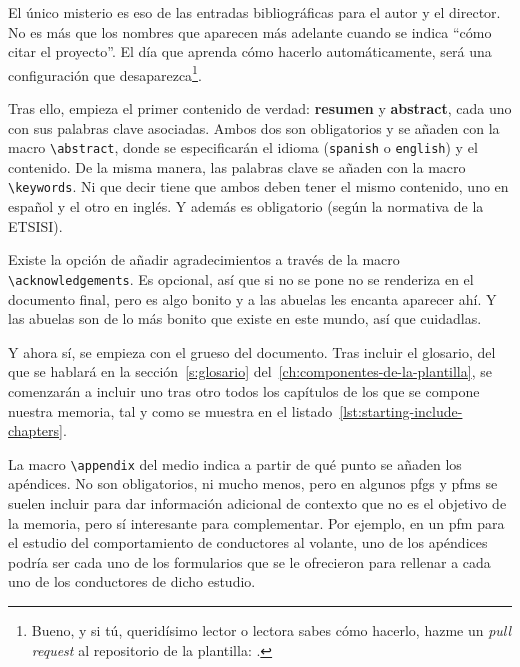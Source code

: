 El único misterio es eso de las entradas bibliográficas para el autor y el director. No es más que los nombres que aparecen más adelante cuando se indica \enquote{cómo citar el proyecto}. El día que aprenda cómo hacerlo automáticamente, será una configuración que desaparezca\footnote{Bueno, y si tú, queridísimo lector o lectora sabes cómo hacerlo, hazme un \textit{pull request} al repositorio de la plantilla: \href{\templaterepository}{\templaterepository}.}.

Tras ello, empieza el primer contenido de verdad: \textbf{resumen} y \textbf{abstract}, cada uno con sus palabras clave asociadas. Ambos dos son obligatorios y se añaden con la macro \lstinline{\abstract}, donde se especificarán el idioma (\texttt{spanish} o \texttt{english}) y el contenido. De la misma manera, las palabras clave se añaden con la macro \lstinline{\keywords}. Ni que decir tiene que ambos deben tener el mismo contenido, uno en español y el otro en inglés. Y además es obligatorio (según la normativa de la ETSISI).

Existe la opción de añadir agradecimientos a través de la macro \lstinline{\acknowledgements}. Es opcional, así que si no se pone no se renderiza en el documento final, pero es algo bonito y a las abuelas les encanta aparecer ahí. Y las abuelas son de lo más bonito que existe en este mundo, así que cuidadlas.

Y ahora sí, se empieza con el grueso del documento. Tras incluir el glosario, del que se hablará en la sección~\ref{s:glosario} del~\ref{ch:componentes-de-la-plantilla}, se comenzarán a incluir uno tras otro todos los capítulos de los que se compone nuestra memoria, tal y como se muestra en el listado~\ref{lst:starting-include-chapters}.



La macro \lstinline{\appendix} del medio indica a partir de qué punto se añaden los apéndices. No son obligatorios, ni mucho menos, pero en algunos \glspl{pfg} y \glspl{pfm} se suelen incluir para dar información adicional de contexto que no es el objetivo de la memoria, pero sí interesante para complementar. Por ejemplo, en un \gls{pfm} para el estudio del comportamiento de conductores al volante, uno de los apéndices podría ser cada uno de los formularios que se le ofrecieron para rellenar a cada uno de los conductores de dicho estudio.

